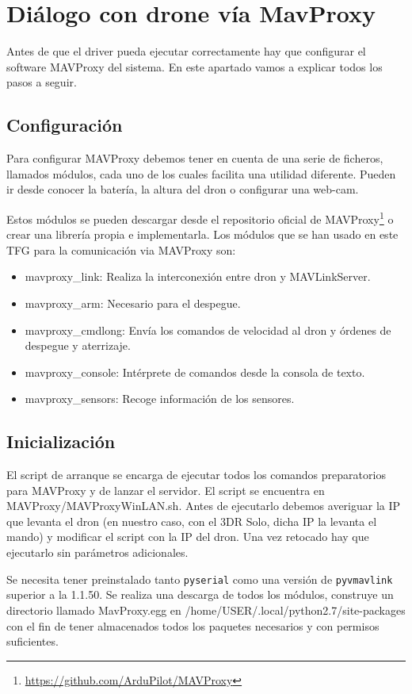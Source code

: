 \section{Diálogo con drone vía MavProxy}
Antes de que el driver pueda ejecutar correctamente hay que configurar el software MAVProxy del sistema. En este apartado vamos a explicar todos los pasos a seguir.

\subsection{Configuración}
\label{Pre-Configuracion}
Para configurar MAVProxy debemos tener en cuenta de una serie de ficheros, llamados módulos,  cada uno de los cuales facilita una utilidad diferente. Pueden ir desde conocer la batería, la altura del dron o configurar una web-cam.

Estos módulos se pueden descargar desde el repositorio oficial de MAVProxy\footnote{\url{https://github.com/ArduPilot/MAVProxy}} o crear una librería propia e implementarla. Los módulos que se han usado en este TFG para la comunicación via MAVProxy son: 

\begin{itemize}
\item mavproxy\_link: Realiza la interconexión entre dron y MAVLinkServer.
\item mavproxy\_arm: Necesario para el despegue.
\item mavproxy\_cmdlong: Envía los comandos de velocidad al dron y órdenes de despegue y aterrizaje.
\item mavproxy\_console: Intérprete de comandos desde la consola de texto.
\item mavproxy\_sensors: Recoge información de los sensores.
\end{itemize}

\subsection{Inicialización}
El script de arranque se encarga de ejecutar todos los comandos preparatorios para MAVProxy y de lanzar el servidor. El script se encuentra en MAVProxy/MAVProxyWinLAN.sh. Antes de ejecutarlo debemos averiguar la IP que levanta el dron (en nuestro caso, con el 3DR Solo, dicha IP la levanta el mando) y modificar el script con la IP del dron. Una vez retocado hay que ejecutarlo sin parámetros adicionales. 

Se necesita tener preinstalado tanto \texttt{pyserial} como una versión de \texttt{pyvmavlink} superior a la 1.1.50. Se realiza una descarga de todos los módulos, construye un directorio llamado MavProxy.egg en /home/USER/.local/python2.7/site-packages con el fin de tener almacenados todos los paquetes necesarios y con permisos suficientes. 

